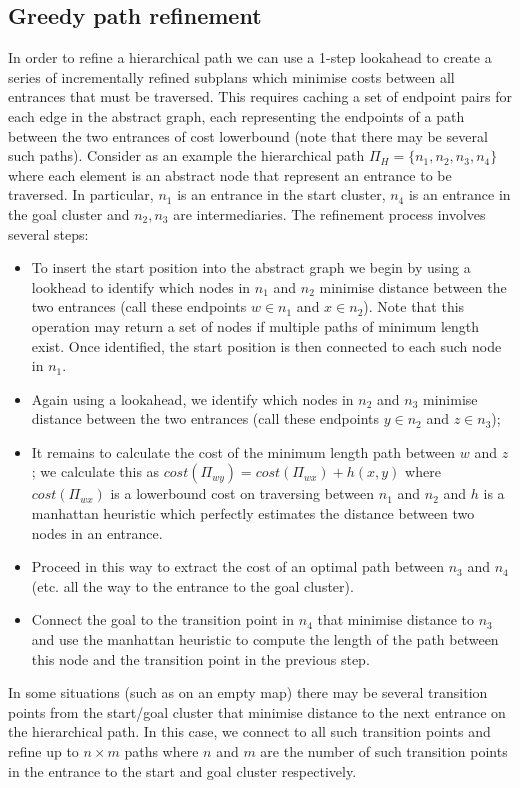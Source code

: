 \subsection{Greedy path refinement}
In order to refine a hierarchical path we can use a 1-step lookahead to create a series of incrementally refined subplans which minimise costs between all entrances that must be traversed.
This requires caching a set of endpoint pairs for each edge in the abstract graph, each representing the endpoints of a path between the two entrances of cost lowerbound (note that there may be several such paths).
Consider as an example the hierarchical path $\Pi_{H} = \lbrace n_{1}, n_{2}, n_{3}, n_{4} \rbrace$ where each element is an abstract node that represent an entrance to be traversed.
In particular, $n_{1}$ is an entrance in the start cluster, $n_{4}$ is an entrance in the goal cluster and $n_{2}, n_{3}$ are intermediaries. 
The refinement process involves several steps:
\begin{itemize}
\item{To insert the start position into the abstract graph we begin by using a lookhead to identify which nodes in $n_{1}$  and $n_{2}$ minimise distance between the two entrances (call these endpoints $w \in n_{1}$ and $x \in n_{2}$). 
Note that this operation may return a set of nodes if multiple paths of minimum length exist.
Once identified, the start position is then connected to each such node in $n_{1}$.}
\item{Again using a lookahead, we identify which nodes in $n_{2}$ and $n_{3}$ minimise distance between the two entrances (call these endpoints $y \in n_{2}$ and $z \in n_{3}$);}
\item{It remains to calculate the cost of the minimum length path between $w$ and $z$; we calculate this as $cost(\Pi_{wy}) = cost(\Pi_{wx}) + h(x, y)$ where $cost(\Pi_{wx})$ is a lowerbound cost on traversing between $n_{1}$ and $n_{2}$ and $h$ is a manhattan heuristic which perfectly estimates the distance between two nodes in an entrance.  }
\item{Proceed in this way to extract the cost of an optimal path between $n_{3}$ and $n_{4}$ (etc. all the way to the entrance to the goal cluster).}
\item{Connect the goal to the transition point in $n_{4}$ that minimise distance to $n_{3}$ and use the manhattan heuristic to compute the length of the path between this node and the transition point in the previous step. }
\end{itemize}
In some situations (such as on an empty map) there may be several transition points from the start/goal cluster that minimise distance to the next entrance on the hierarchical path. 
In this case, we connect to all such transition points and refine up to $n \times m$ paths where $n$ and $m$ are the number of such transition points in the entrance to the start and goal cluster respectively.

